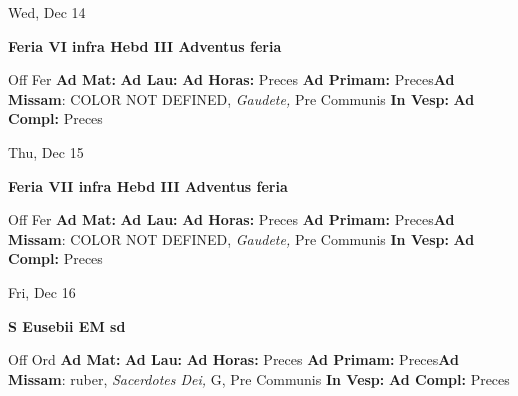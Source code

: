 \documentclass[10pt]{memoir}
\begin{document}
\begin{center}
\begin{minipage}{3.5in}
\vspace{2em}
\begin{center}Wed, Dec 14
\end{center}
\textbf{ \large Feria VI infra Hebd III Adventus
\textnormal{\normalsize feria}}

\begin{justify}Off Fer
\textbf{Ad Mat: }
\textbf{Ad Lau: }
\textbf{Ad Horas: }Preces
\textbf{Ad Primam: }Preces\textbf{Ad Missam}: COLOR NOT DEFINED, \textit{Gaudete,} Pre Communis
\textbf{In Vesp: }
\textbf{Ad Compl: }Preces
\end{justify}
\end{minipage}
\end{center}

\begin{center}
\begin{minipage}{3.5in}
\vspace{2em}
\begin{center}Thu, Dec 15
\end{center}
\textbf{ \large Feria VII infra Hebd III Adventus
\textnormal{\normalsize feria}}

\begin{justify}Off Fer
\textbf{Ad Mat: }
\textbf{Ad Lau: }
\textbf{Ad Horas: }Preces
\textbf{Ad Primam: }Preces\textbf{Ad Missam}: COLOR NOT DEFINED, \textit{Gaudete,} Pre Communis
\textbf{In Vesp: }
\textbf{Ad Compl: }Preces
\end{justify}
\end{minipage}
\end{center}

\begin{center}
\begin{minipage}{3.5in}
\vspace{2em}
\begin{center}Fri, Dec 16
\end{center}
\textbf{ \large S Eusebii EM
\textnormal{\normalsize sd}}

\begin{justify}Off Ord
\textbf{Ad Mat: }
\textbf{Ad Lau: }
\textbf{Ad Horas: }Preces
\textbf{Ad Primam: }Preces\textbf{Ad Missam}: ruber, \textit{Sacerdotes Dei,} G, Pre Communis
\textbf{In Vesp: }
\textbf{Ad Compl: }Preces
\end{justify}
\end{minipage}
\end{center}
\end{document}
